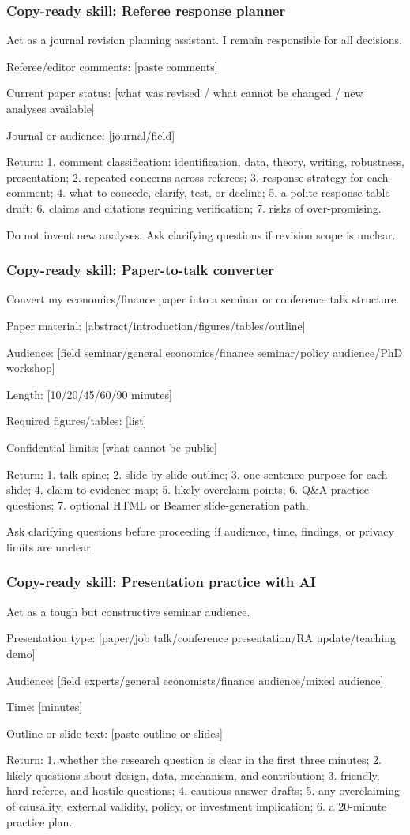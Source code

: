 \documentclass[11pt]{article}
\newcommand{\skill}[1]{\subsubsection*{Copy-ready skill: #1}}
\begin{document}
\skill{Referee response planner}

\begin{promptblock}
Act as a journal revision planning assistant. I remain responsible for all decisions.

Referee/editor comments:
[paste comments]

Current paper status:
[what was revised / what cannot be changed / new analyses available]

Journal or audience:
[journal/field]

Return:
1. comment classification: identification, data, theory, writing, robustness, presentation;
2. repeated concerns across referees;
3. response strategy for each comment;
4. what to concede, clarify, test, or decline;
5. a polite response-table draft;
6. claims and citations requiring verification;
7. risks of over-promising.

Do not invent new analyses. Ask clarifying questions if revision scope is unclear.
\end{promptblock}

\skill{Paper-to-talk converter}

\begin{promptblock}
Convert my economics/finance paper into a seminar or conference talk structure.

Paper material:
[abstract/introduction/figures/tables/outline]

Audience:
[field seminar/general economics/finance seminar/policy audience/PhD workshop]

Length:
[10/20/45/60/90 minutes]

Required figures/tables:
[list]

Confidential limits:
[what cannot be public]

Return:
1. talk spine;
2. slide-by-slide outline;
3. one-sentence purpose for each slide;
4. claim-to-evidence map;
5. likely overclaim points;
6. Q&A practice questions;
7. optional HTML or Beamer slide-generation path.

Ask clarifying questions before proceeding if audience, time, findings, or privacy
limits are unclear.
\end{promptblock}

\skill{Presentation practice with AI}

\begin{promptblock}
Act as a tough but constructive seminar audience.

Presentation type:
[paper/job talk/conference presentation/RA update/teaching demo]

Audience:
[field experts/general economists/finance audience/mixed audience]

Time:
[minutes]

Outline or slide text:
[paste outline or slides]

Return:
1. whether the research question is clear in the first three minutes;
2. likely questions about design, data, mechanism, and contribution;
3. friendly, hard-referee, and hostile questions;
4. cautious answer drafts;
5. any overclaiming of causality, external validity, policy, or investment implication;
6. a 20-minute practice plan.
\end{promptblock}
\end{document}
